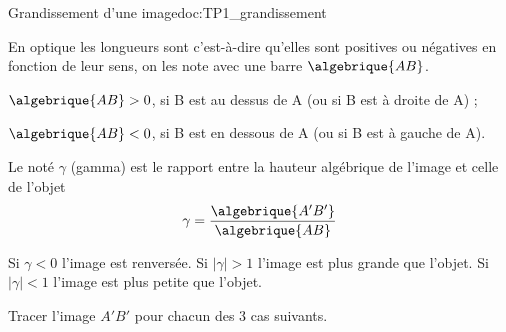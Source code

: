 \begin{doc}{Grandissement d'une image}{doc:TP1_grandissement}
  
  \begin{encart}
    En optique les longueurs sont  c'est-à-dire qu'elles sont positives ou négatives en fonction de leur sens, on les note avec une barre $\algebrique{AB}$.
  \end{encart}
  \begin{listePoints}
    \item $\algebrique{AB} > 0$, si B est au dessus de A (ou si B est à droite de A) ;
    \item $\algebrique{AB} < 0$, si B est en dessous de A (ou si B est à gauche de A).
  \end{listePoints}
  
  \begin{encart}
    Le  noté $\gamma$ (gamma) est le rapport entre la hauteur algébrique de l'image et celle de l'objet
    \begin{equation*}
      \gamma = \dfrac{\algebrique{A'B'}}{\algebrique{AB}}
    \end{equation*}
  \end{encart}
  Si $\gamma < 0$ l'image est renversée.
  Si $|\gamma| > 1$ l'image est plus grande que l'objet. 
  Si $|\gamma| < 1$ l'image est plus petite que l'objet.
\end{doc}


\nomPrenomClasse

\numeroQuestion
Tracer l'image $A'B'$ pour chacun des 3 cas suivants.

\begin{center}
  
  \vspace*{24pt}
  
  \vspace*{24pt}
  
\end{center}




